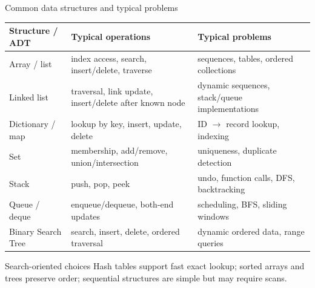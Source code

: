 \documentclass[aspectratio=169]{beamer}
\begin{document}
\begin{frame}{Common data structures and typical problems}
\scriptsize
\begin{center}
\renewcommand{\arraystretch}{1.18}
\begin{tabular}{L{0.19\textwidth}L{0.34\textwidth}L{0.33\textwidth}}
\toprule
\textbf{Structure / ADT} & \textbf{Typical operations} & \textbf{Typical problems} \\
\midrule
Array / list & index access, search, insert/delete, traverse & sequences, tables, ordered collections \\
Linked list & traversal, link update, insert/delete after known node & dynamic sequences, stack/queue implementations \\
Dictionary / map & lookup by key, insert, update, delete & ID $\to$ record lookup, indexing \\
Set & membership, add/remove, union/intersection & uniqueness, duplicate detection \\
Stack & push, pop, peek & undo, function calls, DFS, backtracking \\
Queue / deque & enqueue/dequeue, both-end updates & scheduling, BFS, sliding windows \\
Binary Search Tree & search, insert, delete, ordered traversal & dynamic ordered data, range queries \\
\bottomrule
\end{tabular}
\end{center}
\begin{alertblock}{Search-oriented choices}
Hash tables support fast exact lookup; sorted arrays and trees preserve order; sequential structures are simple but may require scans.
\end{alertblock}
\end{frame}
\end{document}
